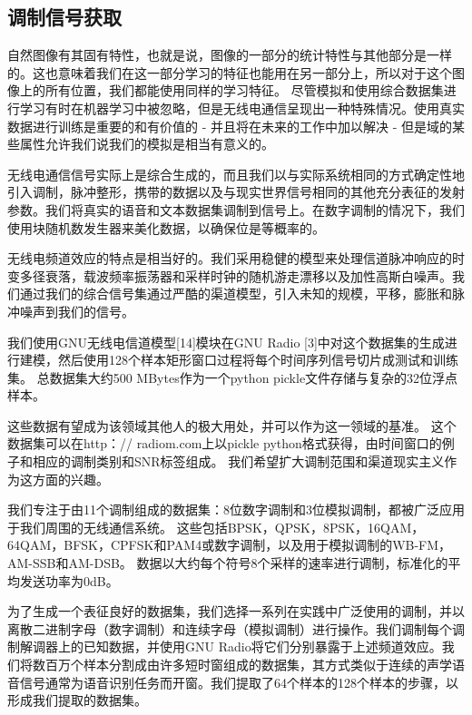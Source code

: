 \subsection{调制信号获取}
自然图像有其固有特性，也就是说，图像的一部分的统计特性与其他部分是一样的。这也意味着我们在这一部分学习的特征也能用在另一部分上，所以对于这个图像上的所有位置，我们都能使用同样的学习特征。
尽管模拟和使用综合数据集进行学习有时在机器学习中被忽略，但是无线电通信呈现出一种特殊情况。使用真实数据进行训练是重要的和有价值的 - 并且将在未来的工作中加以解决 - 但是域的某些属性允许我们说我们的模拟是相当有意义的。\par

无线电通信信号实际上是综合生成的，而且我们以与实际系统相同的方式确定性地引入调制，脉冲整形，携带的数据以及与现实世界信号相同的其他充分表征的发射参数。我们将真实的语音和文本数据集调制到信号上。在数字调制的情况下，我们使用块随机数发生器来美化数据，以确保位是等概率的。\par
无线电频道效应的特点是相当好的。我们采用稳健的模型来处理信道脉冲响应的时变多径衰落，载波频率振荡器和采样时钟的随机游走漂移以及加性高斯白噪声。我们通过我们的综合信号集通过严酷的渠道模型，引入未知的规模，平移，膨胀和脉冲噪声到我们的信号。\par
我们使用GNU无线电信道模型[14]模块在GNU Radio [3]中对这个数据集的生成进行建模，然后使用128个样本矩形窗口过程将每个时间序列信号切片成测试和训练集。 总数据集大约500 MBytes作为一个python pickle文件存储与复杂的32位浮点样本。\par

这些数据有望成为该领域其他人的极大用处，并可以作为这一领域的基准。 这个数据集可以在http：// radiom.com上以pickle python格式获得，由时间窗口的例子和相应的调制类别和SNR标签组成。 我们希望扩大调制范围和渠道现实主义作为这方面的兴趣。\par

我们专注于由11个调制组成的数据集：8位数字调制和3位模拟调制，都被广泛应用于我们周围的无线通信系统。 这些包括BPSK，QPSK，8PSK，16QAM，64QAM，BFSK，CPFSK和PAM4或数字调制，以及用于模拟调制的WB-FM，AM-SSB和AM-DSB。 数据以大约每个符号8个采样的速率进行调制，标准化的平均发送功率为0dB。\par

为了生成一个表征良好的数据集，我们选择一系列在实践中广泛使用的调制，并以离散二进制字母（数字调制）和连续字母（模拟调制）进行操作。我们调制每个调制解调器上的已知数据，并使用GNU Radio将它们分别暴露于上述频道效应。我们将数百万个样本分割成由许多短时窗组成的数据集，其方式类似于连续的声学语音信号通常为语音识别任务而开窗。我们提取了64个样本的128个样本的步骤，以形成我们提取的数据集。\par

